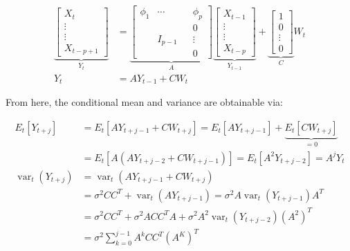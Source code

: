 \documentclass[]{book}
\theoremstyle{definition}
\theoremstyle{definition}
\theoremstyle{definition}
\theoremstyle{remark}
\begin{document}
{\[\begin{aligned}
  \underbrace {\left[ {\begin{array}{*{20}{c}}
  {{X_t}} \\ 
   \vdots  \\ 
   \vdots  \\ 
  {{X_{t - p + 1}}} 
\end{array}} \right]}_{{Y_t}} &= \underbrace {\left[ {\begin{array}{*{20}{c}}
  {{\phi _1}}& \cdots &{}&{{\phi _p}} \\ 
  {}&{}&{}&0 \\ 
  {}&{{I_{p - 1}}}&{}& \vdots  \\ 
  {}&{}&{}&0 
\end{array}} \right]}_A\underbrace {\left[ {\begin{array}{*{20}{c}}
  {{X_{t - 1}}} \\ 
   \vdots  \\ 
   \vdots  \\ 
  {{X_{t - p}}} 
\end{array}} \right]}_{{Y_{t - 1}}} + \underbrace {\left[ {\begin{array}{*{20}{c}}
  1 \\ 
  0 \\ 
   \vdots  \\ 
  0 
\end{array}} \right]}_C{W_t} \\
  {Y_t} &= A{Y_{t - 1}} + C{W_t} 
\end{aligned}\]

From here, the conditional mean and variance are obtainable via:

\[\begin{aligned}
  {E_t}\left[ {{Y_{t + j}}} \right] &= {E_t}\left[ {A{Y_{t + j - 1}} + C{W_{t + j}}} \right] = {E_t}\left[ {A{Y_{t + j - 1}}} \right] + \underbrace {{E_t}\left[ {C{W_{t + j}}} \right]}_{ = 0} \\
   &= {E_t}\left[ {A\left( {A{Y_{t + j - 2}} + C{W_{t + j - 1}}} \right)} \right] = {E_t}\left[ {{A^2}{Y_{t + j - 2}}} \right] = {A^j}{Y_t} \\ 
  {\operatorname{var} _t}\left( {{Y_{t + j}}} \right) &= {\operatorname{var} _t}\left( {A{Y_{t + j - 1}} + C{W_{t + j}}} \right) \\
   &= {\sigma ^2}C{C^T} + {\operatorname{var} _t}\left( {A{Y_{t + j - 1}}} \right) = {\sigma ^2}A{\operatorname{var} _t}\left( {{Y_{t + j - 1}}} \right){A^T} \\
   &= {\sigma ^2}C{C^T} + {\sigma ^2}AC{C^T}A + {\sigma ^2}{A^2}{\operatorname{var} _t}\left( {{Y_{t + j - 2}}} \right){\left( {{A^2}} \right)^T} \\
   &= {\sigma ^2}\sum\limits_{k = 0}^{j - 1} {{A^k}C{C^T}{{\left( {{A^K}} \right)}^T}}  \\ 
\end{aligned} \]

}
\end{document}
